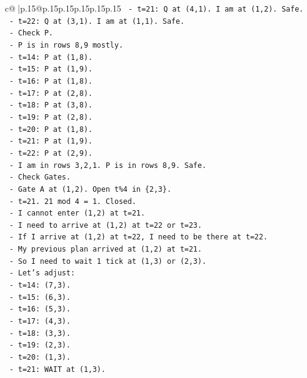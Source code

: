 \documentclass{article}
\begin{document}
{\begin{supertabular}{c@{$\;$}|p{.15\linewidth}@{}p{.15\linewidth}p{.15\linewidth}p{.15\linewidth}p{.15\linewidth}p{.15\linewidth}}
{{{\texttt{    {-} t=21: Q at (4,1). I am at (1,2). Safe.} \\
\texttt{    {-} t=22: Q at (3,1). I am at (1,1). Safe.} \\
\texttt{    {-} Check P.} \\
\texttt{    {-} P is in rows 8,9 mostly.} \\
\texttt{    {-} t=14: P at (1,8).} \\
\texttt{    {-} t=15: P at (1,9).} \\
\texttt{    {-} t=16: P at (1,8).} \\
\texttt{    {-} t=17: P at (2,8).} \\
\texttt{    {-} t=18: P at (3,8).} \\
\texttt{    {-} t=19: P at (2,8).} \\
\texttt{    {-} t=20: P at (1,8).} \\
\texttt{    {-} t=21: P at (1,9).} \\
\texttt{    {-} t=22: P at (2,9).} \\
\texttt{    {-} I am in rows 3,2,1. P is in rows 8,9. Safe.} \\
\texttt{    {-} Check Gates.} \\
\texttt{    {-} Gate A at (1,2). Open t\%4 in \{2,3\}.} \\
\texttt{    {-} t=21. 21 mod 4 = 1. Closed.} \\
\texttt{    {-} I cannot enter (1,2) at t=21.} \\
\texttt{    {-} I need to arrive at (1,2) at t=22 or t=23.} \\
\texttt{    {-} If I arrive at (1,2) at t=22, I need to be there at t=22.} \\
\texttt{    {-} My previous plan arrived at (1,2) at t=21.} \\
\texttt{    {-} So I need to wait 1 tick at (1,3) or (2,3).} \\
\texttt{    {-} Let's adjust:} \\
\texttt{      {-} t=14: (7,3).} \\
\texttt{      {-} t=15: (6,3).} \\
\texttt{      {-} t=16: (5,3).} \\
\texttt{      {-} t=17: (4,3).} \\
\texttt{      {-} t=18: (3,3).} \\
\texttt{      {-} t=19: (2,3).} \\
\texttt{      {-} t=20: (1,3).} \\
\texttt{      {-} t=21: WAIT at (1,3).} \\
}}}
\end{supertabular}}
\end{document}
